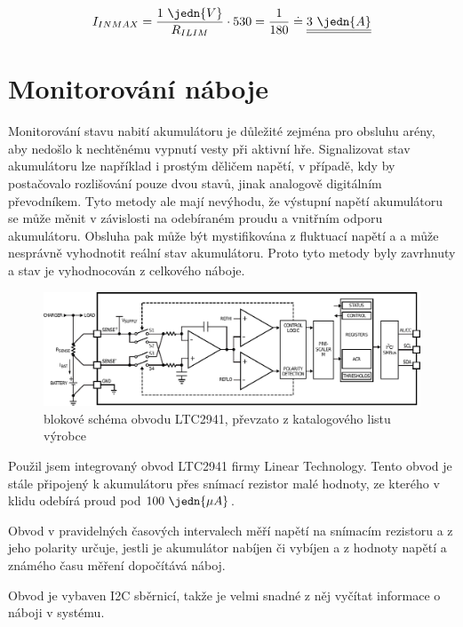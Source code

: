$$I_{IN MAX} = \dfrac{1~\jedn{V}}{R_{ILIM}} \cdot 530 = \dfrac{1}{180} \doteq \underline{\underline{3~\jedn{A}}}$$ \nonumber

\section{Monitorování náboje}
Monitorování stavu nabití akumulátoru je důležité zejména pro obsluhu arény, aby nedošlo k nechtěnému vypnutí vesty při aktivní hře. Signalizovat stav akumulátoru lze například i prostým děličem napětí, v případě, kdy by postačovalo rozlišování pouze dvou stavů, jinak analogově digitálním převodníkem. Tyto metody ale mají nevýhodu, že výstupní napětí akumulátoru se může měnit v závislosti na odebíraném proudu a vnitřním odporu akumulátoru. Obsluha pak může být mystifikována z fluktuací napětí a a může nesprávně vyhodnotit reální stav akumulátoru. Proto tyto metody byly zavrhnuty a stav je vyhodnocován z celkového náboje.

\begin{figure}[H]
    \begin{center}
        \includegraphics[width=\textwidth]{img/LTC2941-block}
    \end{center}
    \caption{blokové schéma obvodu LTC2941, převzato z katalogového listu výrobce}
\end{figure}
Použil jsem integrovaný obvod LTC2941 firmy Linear Technology. Tento obvod je stále připojený k akumulátoru přes snímací rezistor malé hodnoty, ze kterého v klidu odebírá proud pod $100~\jedn{\mu A}$.

Obvod v pravidelných časových intervalech měří napětí na snímacím rezistoru a z jeho polarity určuje, jestli je akumulátor nabíjen či vybíjen a z hodnoty napětí a známého času měření dopočítává náboj.

Obvod je vybaven I2C sběrnicí, takže je velmi snadné z něj vyčítat informace o náboji v systému.


